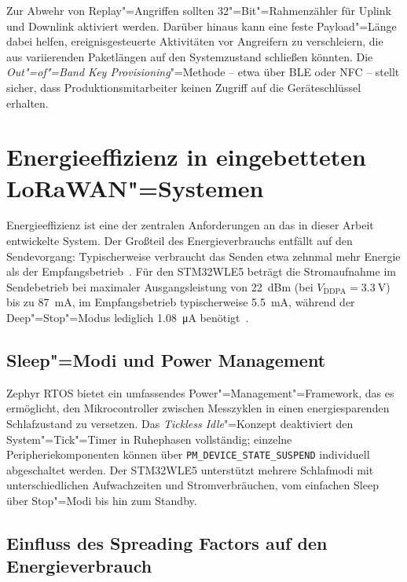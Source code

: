 Zur Abwehr von Replay"=Angriffen sollten 32"=Bit"=Rahmenzähler für Uplink und Downlink
aktiviert werden. Darüber hinaus kann eine feste Payload"=Länge dabei helfen, ereignisgesteuerte
Aktivitäten vor Angreifern zu verschleiern, die aus variierenden Paketlängen auf den
Systemzustand schließen könnten. Die \textit{Out"=of"=Band Key Provisioning}"=Methode
-- etwa über BLE oder NFC -- stellt sicher, dass Produktionsmitarbeiter keinen Zugriff %
auf die Geräteschlüssel erhalten.

\section{Energieeffizienz in eingebetteten LoRaWAN"=Systemen}
\label{sec:energieeffizienz}

Energieeffizienz ist eine der zentralen Anforderungen an das in dieser Arbeit
entwickelte System. Der Großteil des Energieverbrauchs entfällt auf den Sendevorgang:
Typischerweise verbraucht das Senden etwa zehnmal mehr Energie als der
Empfangsbetrieb~\cite{semtech_lora_basics}. Für den STM32WLE5 beträgt die Stromaufnahme
im Sendebetrieb bei maximaler Ausgangsleistung von \SI{22}{dBm} (bei $V_\text{DDPA} =
\SI{3.3}{\V}$) bis zu \SI{87}{\mA}, im Empfangsbetrieb typischerweise \SI{5.5}{\mA},
während der Deep"=Stop"=Modus lediglich \SI{1.08}{\uA} benötigt~\cite{stm32wl_ds}.

\subsection{Sleep"=Modi und Power Management}
\label{subsec:sleep}

Zephyr RTOS bietet ein umfassendes Power"=Management"=Framework, das es ermöglicht,
den Mikrocontroller zwischen Messzyklen in einen energiesparenden Schlafzustand zu
versetzen. Das \textit{Tickless Idle}"=Konzept deaktiviert den System"=Tick"=Timer
in Ruhephasen vollständig; einzelne Peripheriekomponenten können über
\texttt{PM\_DEVICE\_STATE\_SUSPEND} individuell abgeschaltet werden. Der STM32WLE5
unterstützt mehrere Schlafmodi mit unterschiedlichen Aufwachzeiten und
Stromverbräuchen, vom einfachen Sleep über Stop"=Modi bis hin zum Standby.

\subsection{Einfluss des Spreading Factors auf den Energieverbrauch}
\label{subsec:sf-energie}


